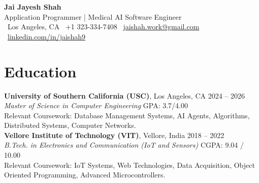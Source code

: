 \documentclass[letterpaper,11pt]{article}
\begin{document}
\begin{center}
    {\LARGE \textbf{Jai Jayesh Shah}}\\
    {\normalsize Application Programmer | Medical AI Software Engineer}\\
    \small
    \faMapMarker*\ Los Angeles, CA
    \quad
    \faPhone*\ +1 323-334-7408
    \quad
    \faEnvelope\ \href{mailto:jaishah.work@gmail.com}{jaishah.work@gmail.com}
    \quad
    \faLinkedin\ \href{https://www.linkedin.com/in/jaishah9}{linkedin.com/in/jaishah9}
\end{center}
\vspace{-13pt}


\section*{Education}
\textbf{University of Southern California (USC)}, Los Angeles, CA \hfill 2024 -- 2026 \\
\textit{Master of Science in Computer Engineering} \hfill GPA: 3.7/4.00 \\
Relevant Coursework: Database Management Systems, AI Agents, Algorithms, Distributed Systems, Computer Networks. \\
\textbf{Vellore Institute of Technology (VIT)}, Vellore, India \hfill 2018 -- 2022 \\
\textit{B.Tech. in Electronics and Communication (IoT and Sensors)} \hfill CGPA: 9.04 / 10.00 \\
Relevant Coursework: IoT Systems, Web Technologies, Data Acquisition, Object Oriented Programming, Advanced Microcontrollers.

\end{document}
